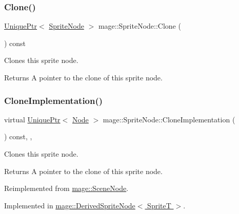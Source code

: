 \subsubsection{\texorpdfstring{Clone()}{Clone()}}
{\footnotesize\ttfamily \hyperlink{namespacemage_a3316d7143a973e37adf1110f2e80ca31}{Unique\+Ptr}$<$ \hyperlink{classmage_1_1_sprite_node}{Sprite\+Node} $>$ mage\+::\+Sprite\+Node\+::\+Clone (\begin{DoxyParamCaption}{ }\end{DoxyParamCaption}) const}

Clones this sprite node.

\begin{DoxyReturn}{Returns}
A pointer to the clone of this sprite node. 
\end{DoxyReturn}
\hypertarget{classmage_1_1_sprite_node_a83a2a865b38670d64491a1066895e218}{}\label{classmage_1_1_sprite_node_a83a2a865b38670d64491a1066895e218} 
\subsubsection{\texorpdfstring{Clone\+Implementation()}{CloneImplementation()}}
{\footnotesize\ttfamily virtual \hyperlink{namespacemage_a3316d7143a973e37adf1110f2e80ca31}{Unique\+Ptr}$<$ \hyperlink{classmage_1_1_node}{Node} $>$ mage\+::\+Sprite\+Node\+::\+Clone\+Implementation (\begin{DoxyParamCaption}{ }\end{DoxyParamCaption}) const\hspace{0.3cm}{\ttfamily [override]}, {\ttfamily [private]}, {}}

Clones this sprite node.

\begin{DoxyReturn}{Returns}
A pointer to the clone of this sprite node. 
\end{DoxyReturn}


Reimplemented from \hyperlink{classmage_1_1_scene_node_a42d0d53ab804d38ebd584d2de6490eeb}{mage\+::\+Scene\+Node}.



Implemented in \hyperlink{classmage_1_1_derived_sprite_node_ae1aa2b80d4ff8688635df017826c11a5}{mage\+::\+Derived\+Sprite\+Node$<$ Sprite\+T $>$}.

\hypertarget{classmage_1_1_sprite_node_a84806dd38c94900f0fabf0163a706370}{}\label{classmage_1_1_sprite_node_a84806dd38c94900f0fabf0163a706370} 
